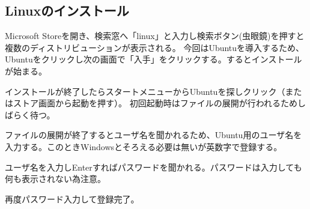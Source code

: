 \documentclass[autodetect-engine,dvipdfmx-if-dvi,ja=standard,a4j]{bxjsarticle}
\begin{document}
		\subsection{Linuxのインストール}
			Microsoft Storeを開き、検索窓へ「linux」と入力し検索ボタン(虫眼鏡)を押すと複数のディストリビューションが表示される。
			今回はUbuntuを導入するため、Ubuntuをクリックし次の画面で「入手」をクリックする。するとインストールが始まる。\par
			インストールが終了したらスタートメニューからUbuntuを探しクリック（またはストア画面から起動を押す）。
			初回起動時はファイルの展開が行われるためしばらく待つ。\par\noindent
			ファイルの展開が終了するとユーザ名を聞かれるため、Ubuntu用のユーザ名を入力する。このときWindowsとそろえる必要は無いが英数字で登録する。\par\noindent
			ユーザ名を入力しEnterすればパスワードを聞かれる。パスワードは入力しても何も表示されない為注意。\par\noindent
			再度パスワード入力して登録完了。\par
			
\end{document}
